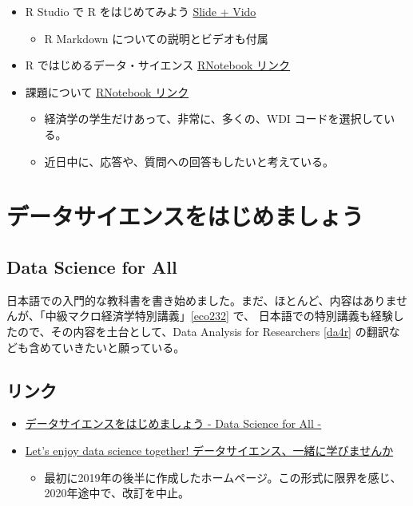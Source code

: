 \documentclass[
]{book}
\providecommand{\tightlist}{%
  \setlength{\itemsep}{0pt}\setlength{\parskip}{0pt}}
\theoremstyle{definition}
\theoremstyle{definition}
\theoremstyle{definition}
\theoremstyle{definition}
\theoremstyle{remark}
\begin{document}
\begin{itemize}
\item
  R Studio で R をはじめてみよう \href{https://ds-sl.github.io/intro2r/getstarted.html}{Slide + Vido}

  \begin{itemize}
  \tightlist
  \item
    R Markdown についての説明とビデオも付属
  \end{itemize}
\item
  R ではじめるデータ・サイエンス \href{https://ds-sl.github.io/intro2r/eco232.nb.html}{RNotebook リンク}
\item
  課題について \href{https://ds-sl.github.io/intro2r/resp_assignment.nb.html}{RNotebook リンク}

  \begin{itemize}
  \tightlist
  \item
    経済学の学生だけあって、非常に、多くの、WDI コードを選択している。
  \item
    近日中に、応答や、質問への回答もしたいと考えている。
  \end{itemize}
\end{itemize}

\hypertarget{ds4aj}{%
\chapter{データサイエンスをはじめましょう}\label{ds4aj}}

\hypertarget{data-science-for-all}{%
\section*{Data Science for All}\label{data-science-for-all}}

日本語での入門的な教科書を書き始めました。まだ、ほとんど、内容はありませんが、「中級マクロ経済学特別講義」\ref{eco232} で、 日本語での特別講義も経験したので、その内容を土台として、Data Analysis for Researchers \ref{da4r} の翻訳なども含めていきたいと願っている。

\hypertarget{ux30eaux30f3ux30af}{%
\section{リンク}\label{ux30eaux30f3ux30af}}

\begin{itemize}
\item
  \href{https://icu-hsuzuki.github.io/ds4aj/index.html}{データサイエンスをはじめましょう - Data Science for All -}
\item
  \href{https://foods4all.github.io/}{Let's enjoy data science together! データサイエンス、一緒に学びませんか}

  \begin{itemize}
  \tightlist
  \item
    最初に2019年の後半に作成したホームページ。この形式に限界を感じ、2020年途中で、改訂を中止。
  \end{itemize}
\end{itemize}
\end{document}

